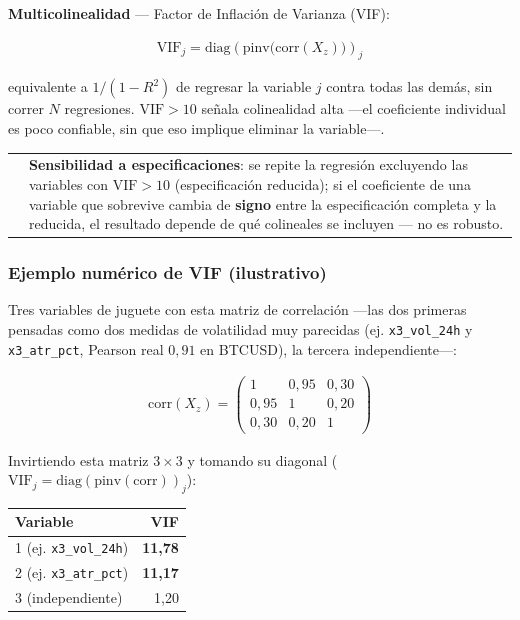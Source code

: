 \documentclass[11pt,a4paper]{article}
\makeatletter
\newcommand{\code}[1]{\texttt{\small #1}}
\newenvironment{nota}{%
  \par\medskip\noindent
  \begin{tabular}{@{}p{0.4em}@{\hspace{8pt}}p{\dimexpr\linewidth-2em\relax}@{}}
  \textcolor{cnaranja}{\rule{3pt}{1.1em}} &
}{\end{tabular}\par\medskip}
\newcommand{\bigsep}{\par\vspace{3pt}}
\makeatother
\begin{document}
\bigsep
\textbf{Multicolinealidad} — Factor de Inflación de Varianza (VIF):

\begin{align}
\mathrm{VIF}_j = \mathrm{diag}\!\left(\mathrm{pinv}\big(\mathrm{corr}(X_z)\big)\right)_j
\end{align}

equivalente a \(1/(1-R^2)\) de regresar la variable \(j\) contra todas las demás, sin
correr \(N\) regresiones. \(\mathrm{VIF}>10\) señala colinealidad alta —el coeficiente
individual es poco confiable, sin que eso implique eliminar la variable—.

\begin{nota}
\textbf{Sensibilidad a especificaciones}: se repite la regresión excluyendo las variables
con \(\mathrm{VIF}>10\) (especificación reducida); si el coeficiente de una variable que
sobrevive cambia de \textbf{signo} entre la especificación completa y la reducida, el
resultado depende de qué colineales se incluyen — no es robusto.
\end{nota}

\subsubsection*{Ejemplo numérico de VIF (ilustrativo)}

Tres variables de juguete con esta matriz de correlación —las dos primeras pensadas como
dos medidas de volatilidad muy parecidas (ej. \code{x3\_vol\_24h} y \code{x3\_atr\_pct},
Pearson real \(0{,}91\) en BTCUSD), la tercera independiente—:

\begin{align}
\mathrm{corr}(X_z) = \begin{pmatrix} 1 & 0{,}95 & 0{,}30 \\ 0{,}95 & 1 & 0{,}20 \\
  0{,}30 & 0{,}20 & 1 \end{pmatrix}
\end{align}

Invirtiendo esta matriz \(3\times 3\) y tomando su diagonal (\(\mathrm{VIF}_j =
\mathrm{diag}(\mathrm{pinv}(\mathrm{corr}))_j\)):

\begin{center}
\small
\begin{tabular}{@{}l r@{}}
\toprule
Variable & VIF \\
\midrule
1 (ej. \code{x3\_vol\_24h}) & \textbf{11{,}78} \\
2 (ej. \code{x3\_atr\_pct}) & \textbf{11{,}17} \\
3 (independiente) & 1{,}20 \\
\bottomrule
\end{tabular}
\end{center}
\end{document}
